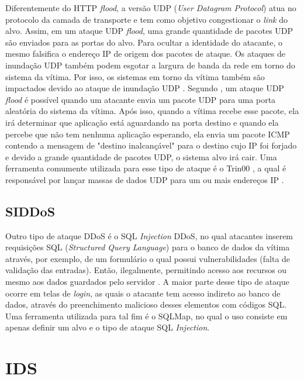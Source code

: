  Diferentemente do HTTP \textit{flood}, a versão UDP (\textit{User Datagram Protocol}) atua no protocolo da camada de transporte e tem como objetivo congestionar o \textit{link} do alvo. Assim, em um ataque UDP \textit{flood}, uma grande quantidade de pacotes UDP são enviados para as portas do alvo. Para ocultar a identidade do atacante, o mesmo falsifica o endereço IP de origem dos pacotes de ataque. Os ataques de inundação UDP também podem esgotar a largura de banda da rede em torno do sistema da vítima. Por isso, os sistemas em torno da vítima também são impactados devido ao ataque de inundação UDP \cite{xiaoming2010denial}. Segundo , um ataque UDP \textit{flood} é possível quando um atacante envia um pacote UDP para uma porta aleatória do sistema da vítima. Após isso, quando a vítima recebe esse pacote, ela irá determinar que aplicação está aguardando na porta destino e quando ela percebe que não tem nenhuma aplicação esperando, ela envia um pacote ICMP contendo a mensagem de "destino inalcançável" para o destino cujo IP foi forjado e devido a grande quantidade de pacotes UDP, o sistema alvo irá cair. Uma ferramenta comumente utilizada para esse tipo de ataque é o Trin00 \cite{criscuolo2000distributed}, a qual é responsável por lançar massas de dados UDP para um ou mais endereços IP \cite{dittrich2002projectos}.
 
 
 \subsection{SIDDoS}   
  Outro tipo de ataque DDoS é o SQL \textit{Injection} DDoS, no qual atacantes inserem  requisições SQL (\textit{Structured Query Language}) para o banco de dados da vítima através, por exemplo, de um formulário o qual possui vulnerabilidades (falta de validação das entradas). Então, ilegalmente, permitindo acesso aos recursos ou mesmo aos dados guardados pelo servidor \cite{DataMining}. A maior parte desse tipo de ataque ocorre em telas de \textit{login}, as quais o atacante tem acesso indireto ao banco de dados, através do preenchimento malicioso desses elementos com códigos SQL. Uma ferramenta utilizada para tal fim é o SQLMap, no qual o uso consiste em apenas definir um alvo e o tipo de ataque SQL \textit{Injection}. 

\section{IDS}

